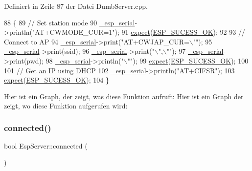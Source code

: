 Definiert in Zeile 87 der Datei Dumb\+Server.\+cpp.


\begin{DoxyCode}
88 \{
89   \textcolor{comment}{// Set station mode}
90   \hyperlink{class_esp_server_a33166aa92db341d47cdf1776492cca62}{\_esp\_serial}->println(\textcolor{stringliteral}{"AT+CWMODE\_CUR=1"});
91   \hyperlink{class_esp_server_a2008f0d315cff00a4bcc1120eeb2dc95}{expect}(\hyperlink{_dumb_server_8cpp_a62497fcb12b1cedd5fdfbc0755508d87}{ESP\_SUCESS\_OK});
92 
93   \textcolor{comment}{// Connect to AP}
94   \hyperlink{class_esp_server_a33166aa92db341d47cdf1776492cca62}{\_esp\_serial}->print(\textcolor{stringliteral}{"AT+CWJAP\_CUR=\(\backslash\)""});
95   \hyperlink{class_esp_server_a33166aa92db341d47cdf1776492cca62}{\_esp\_serial}->print(ssid);
96   \hyperlink{class_esp_server_a33166aa92db341d47cdf1776492cca62}{\_esp\_serial}->print(\textcolor{stringliteral}{"\(\backslash\)",\(\backslash\)""});
97   \hyperlink{class_esp_server_a33166aa92db341d47cdf1776492cca62}{\_esp\_serial}->print(pwd);
98   \hyperlink{class_esp_server_a33166aa92db341d47cdf1776492cca62}{\_esp\_serial}->println(\textcolor{stringliteral}{"\(\backslash\)""});
99   \hyperlink{class_esp_server_a2008f0d315cff00a4bcc1120eeb2dc95}{expect}(\hyperlink{_dumb_server_8cpp_a62497fcb12b1cedd5fdfbc0755508d87}{ESP\_SUCESS\_OK});
100 
101   \textcolor{comment}{// Get an IP using DHCP}
102   \hyperlink{class_esp_server_a33166aa92db341d47cdf1776492cca62}{\_esp\_serial}->println(\textcolor{stringliteral}{"AT+CIFSR"});
103   \hyperlink{class_esp_server_a2008f0d315cff00a4bcc1120eeb2dc95}{expect}(\hyperlink{_dumb_server_8cpp_a62497fcb12b1cedd5fdfbc0755508d87}{ESP\_SUCESS\_OK});
104 \}
\end{DoxyCode}
Hier ist ein Graph, der zeigt, was diese Funktion aufruft\+:
Hier ist ein Graph der zeigt, wo diese Funktion aufgerufen wird\+:
\mbox{\label{class_esp_server_a6a25e008ded89de0e4599df7170008fb}} 
\subsubsection{\texorpdfstring{connected()}{connected()}}
{\footnotesize\ttfamily bool Esp\+Server\+::connected (\begin{DoxyParamCaption}{ }\end{DoxyParamCaption})}



